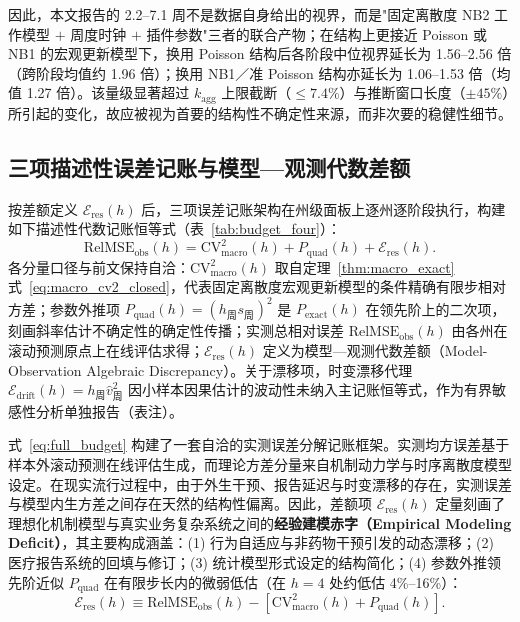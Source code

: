\documentclass[11pt,a4paper]{article}
\theoremstyle{plain}
\theoremstyle{definition}
\begin{document}
因此，本文报告的 2.2--7.1 周不是数据自身给出的视界，而是"固定离散度 NB2 工作模型 $+$ 周度时钟 $+$ 插件参数"三者的联合产物；在结构上更接近 Poisson 或 NB1 的宏观更新模型下，换用 Poisson 结构后各阶段中位视界延长为 1.56--2.56 倍（跨阶段均值约 1.96 倍）；换用 NB1／准 Poisson 结构亦延长为 1.06--1.53 倍（均值 1.27 倍）。该量级显著超过 $k_{\text{agg}}$ 上限截断（$\le 7.4\%$）与推断窗口长度（$\pm 45\%$）所引起的变化，故应被视为首要的结构性不确定性来源，而非次要的稳健性细节。

\begin{table}[htbp]
\centering
\footnotesize
\caption{同一州级面板与同一参数集下，四种宏观方差结构给出的机制视界（周，跨州中位数）}
\label{tab:alt_variance}

\end{table}

\subsection{三项描述性误差记账与模型—观测代数差额}\label{sec:budget}

按差额定义 $\mathcal{E}_{\text{res}}(h)$ 后，三项误差记账架构在州级面板上逐州逐阶段执行，构建如下描述性代数记账恒等式（表~\ref{tab:budget_four}）：
\begin{equation}
\text{RelMSE}_{\text{obs}}(h) = \text{CV}^2_{\text{macro}}(h) + P_{\text{quad}}(h) + \mathcal{E}_{\text{res}}(h).
\label{eq:full_budget}
\end{equation}
各分量口径与前文保持自洽：$\text{CV}^2_{\text{macro}}(h)$ 取自定理~\ref{thm:macro_exact} 式~\eqref{eq:macro_cv2_closed}，代表固定离散度宏观更新模型的条件精确有限步相对方差；参数外推项 $P_{\text{quad}}(h) = (h_{\text{周}} s_{\text{周}})^2$ 是 $P_{\text{exact}}(h)$ 在领先阶上的二次项，刻画斜率估计不确定性的确定性传播；实测总相对误差 $\text{RelMSE}_{\text{obs}}(h)$ 由各州在滚动预测原点上在线评估求得；$\mathcal{E}_{\text{res}}(h)$ 定义为模型—观测代数差额（Model-Observation Algebraic Discrepancy）。关于漂移项，时变漂移代理 $\mathcal{E}_{\text{drift}}(h) = h_{\text{周}}\widehat{v}^2_{\text{周}}$ 因小样本因果估计的波动性未纳入主记账恒等式，作为有界敏感性分析单独报告（表注）。

式~\eqref{eq:full_budget} 构建了一套自洽的实测误差分解记账框架。实测均方误差基于样本外滚动预测在线评估生成，而理论方差分量来自机制动力学与时序离散度模型设定。在现实流行过程中，由于外生干预、报告延迟与时变漂移的存在，实测误差与模型内生方差之间存在天然的结构性偏离。因此，差额项 $\mathcal{E}_{\text{res}}(h)$ 定量刻画了理想化机制模型与真实业务复杂系统之间的\textbf{经验建模赤字（Empirical Modeling Deficit）}，其主要构成涵盖：(1) 行为自适应与非药物干预引发的动态漂移；(2) 医疗报告系统的回填与修订；(3) 统计模型形式设定的结构简化；(4) 参数外推领先阶近似 $P_{\text{quad}}$ 在有限步长内的微弱低估（在 $h=4$ 处约低估 4\%--16\%）：
\begin{equation}
\mathcal{E}_{\text{res}}(h) \equiv \text{RelMSE}_{\text{obs}}(h) - \left[ \text{CV}^2_{\text{macro}}(h) + P_{\text{quad}}(h) \right].
\end{equation}
\end{document}
